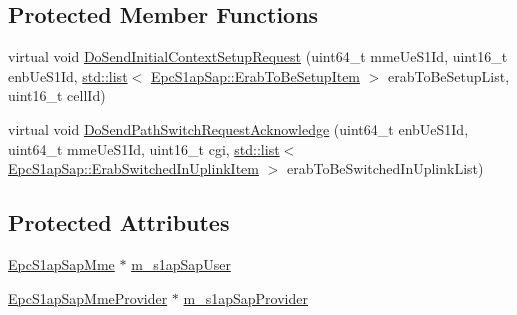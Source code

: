 \subsection*{Protected Member Functions}
\begin{DoxyCompactItemize}
\item 
virtual void \hyperlink{classns3_1_1EpcS1apMme_a75b3fb7d623ed4825f0ffd93541fbdf5}{Do\+Send\+Initial\+Context\+Setup\+Request} (uint64\+\_\+t mme\+Ue\+S1\+Id, uint16\+\_\+t enb\+Ue\+S1\+Id, \hyperlink{openflow-interface_8h_afd9bcfa176617760671b67580f536fa7}{std\+::list}$<$ \hyperlink{structns3_1_1EpcS1apSap_1_1ErabToBeSetupItem}{Epc\+S1ap\+Sap\+::\+Erab\+To\+Be\+Setup\+Item} $>$ erab\+To\+Be\+Setup\+List, uint16\+\_\+t cell\+Id)
\item 
virtual void \hyperlink{classns3_1_1EpcS1apMme_ad4d0fb63ec209aa8cdf3b20700ae6a53}{Do\+Send\+Path\+Switch\+Request\+Acknowledge} (uint64\+\_\+t enb\+Ue\+S1\+Id, uint64\+\_\+t mme\+Ue\+S1\+Id, uint16\+\_\+t cgi, \hyperlink{openflow-interface_8h_afd9bcfa176617760671b67580f536fa7}{std\+::list}$<$ \hyperlink{structns3_1_1EpcS1apSap_1_1ErabSwitchedInUplinkItem}{Epc\+S1ap\+Sap\+::\+Erab\+Switched\+In\+Uplink\+Item} $>$ erab\+To\+Be\+Switched\+In\+Uplink\+List)
\end{DoxyCompactItemize}
\subsection*{Protected Attributes}
\begin{DoxyCompactItemize}
\item 
\hyperlink{classns3_1_1EpcS1apSapMme}{Epc\+S1ap\+Sap\+Mme} $\ast$ \hyperlink{classns3_1_1EpcS1apMme_ab9994a301789a31ce3c324f80266619b}{m\+\_\+s1ap\+Sap\+User}
\item 
\hyperlink{classns3_1_1EpcS1apSapMmeProvider}{Epc\+S1ap\+Sap\+Mme\+Provider} $\ast$ \hyperlink{classns3_1_1EpcS1apMme_a2636a7928a3bd4bef46f629b3555c9d9}{m\+\_\+s1ap\+Sap\+Provider}
\end{DoxyCompactItemize}
